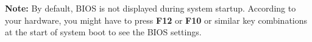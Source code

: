 \begin{flushleft}
\begin{itemize}
\end{itemize}


\bigskip\bigskip
\begin{tcolorbox}[breakable,notitle,boxrule=-0pt,colback=yellow,colframe=yellow]
	\color{black}
	\textbf{Note:} By default, BIOS is not displayed during system startup. According to your hardware, you might have to press \textbf{F12} or \textbf{F10} or similar key combinations at the start of system boot to see the BIOS settings.
\end{tcolorbox}

\end{flushleft}
\newpage


